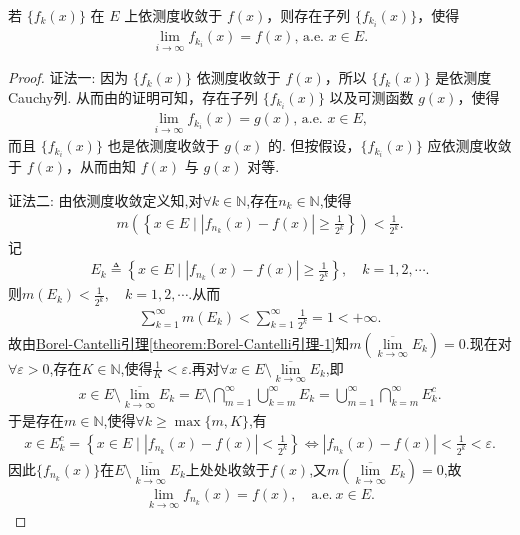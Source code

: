 \documentclass[../../main.tex]{subfiles}%
\begin{document}
\begin{theorem}[Riesz(里斯)定理]\label{theorem:Riesz定理}
若 $\{f_k(x)\}$ 在 $E$ 上依测度收敛于 $f(x)$，则存在子列 $\{f_{k_i}(x)\}$，使得
\begin{align*}
\lim_{i\to\infty}f_{k_i}(x)=f(x),\, \text{a.e. }x\in E.
\end{align*}
\end{theorem}
\begin{proof}

{\color{blue}证法一:}
因为 $\{f_k(x)\}$ 依测度收敛于 $f(x)$，所以 $\{f_k(x)\}$ 是依测度Cauchy列. 从而由的证明可知，存在子列 $\{f_{k_i}(x)\}$ 以及可测函数 $g(x)$，使得
\begin{align*}
\lim_{i\to\infty}f_{k_i}(x)=g(x),\,\text{a.e. }x\in E,
\end{align*}
而且 $\{f_{k_i}(x)\}$ 也是依测度收敛于 $g(x)$ 的. 但按假设，$\{f_{k_i}(x)\}$ 应依测度收敛于 $f(x)$，从而由知 $f(x)$ 与 $g(x)$ 对等. 

{\color{blue}证法二:}
由依测度收敛定义知,对$\forall k \in \mathbb{N}$,存在$n_k \in \mathbb{N}$,使得
\begin{align*}
m\left(\left\{x\in E \mid \left| f_{n_k}(x) - f(x) \right| \geqslant \frac{1}{2^k} \right\}\right) < \frac{1}{2^k}.
\end{align*}
记
\begin{align*}
E_k \triangleq \left\{x\in E \mid \left| f_{n_k}(x) - f(x) \right| \geqslant \frac{1}{2^k} \right\}, \quad k=1,2,\cdots.
\end{align*}
则$m(E_k) < \frac{1}{2^k}, \quad k=1,2,\cdots.$从而
\begin{align*}
\sum\limits_{k=1}^{\infty} m(E_k) < \sum\limits_{k=1}^{\infty} \frac{1}{2^k} = 1 < +\infty.
\end{align*}
故由\hyperref[theorem:Borel-Cantelli引理-1]{Borel-Cantelli引理\ref{theorem:Borel-Cantelli引理-1}}知$m\left( \underset{k\rightarrow \infty}{\overline{\lim }} E_k \right) = 0.$现在对$\forall \varepsilon > 0$,存在$K\in \mathbb{N}$,使得$\frac{1}{K} < \varepsilon.$再对$\forall x \in E \setminus \underset{k\rightarrow \infty}{\overline{\lim }} E_k$,即
\begin{align*}
x \in E \setminus \underset{k\rightarrow \infty}{\overline{\lim }} E_k = E \setminus \bigcap\limits_{m=1}^{\infty}\bigcup\limits_{k=m}^{\infty} E_k = \bigcup\limits_{m=1}^{\infty}\bigcap\limits_{k=m}^{\infty} E_k^c.
\end{align*}
于是存在$m \in \mathbb{N}$,使得$\forall k \geqslant \max\{m, K\}$,有
\begin{align*}
x \in E_k^c = \left\{x\in E \mid \left| f_{n_k}(x) - f(x) \right| < \frac{1}{2^k} \right\} \Longleftrightarrow \left| f_{n_k}(x) - f(x) \right| < \frac{1}{2^k} < \varepsilon.
\end{align*}
因此$\{f_{n_k}(x)\}$在$E \setminus \underset{k\rightarrow \infty}{\overline{\lim }} E_k$上处处收敛于$f(x)$,又$m\left( \underset{k\rightarrow \infty}{\overline{\lim }} E_k \right) = 0$,故
\begin{align*}
\lim_{k\rightarrow \infty} f_{n_k}(x) = f(x), \quad \mathrm{a}.\mathrm{e}. \ x \in E.
\end{align*}
\end{proof}
\end{document}
